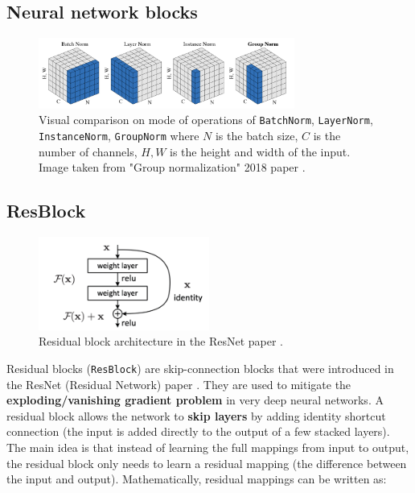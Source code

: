 \subsection{Neural network blocks}
\label{appendix:blocks}


\begin{figure}
    \centering
    \includegraphics[width=0.75\textwidth]{images/appendix/blocks/norm.png}
    \caption{Visual comparison on mode of operations of \texttt{BatchNorm}, \texttt{LayerNorm}, \texttt{InstanceNorm}, \texttt{GroupNorm} where $N$ is the batch size, $C$ is the number of channels, $H,W$ is the height and width of the input. Image taken from "Group normalization" 2018 paper \cite{wu2018group}.}
    \label{fig:appendix_blocks_norm}
\end{figure}





\subsection*{ResBlock}

\begin{figure}
    \centering
    \includegraphics[width=0.5\textwidth]{images/appendix/blocks/resnet.png}
    \caption{Residual block architecture in the ResNet paper \cite{resnet}.}
    \label{fig:appendix_blocks_residual_block}
\end{figure}

Residual blocks (\texttt{ResBlock}) are skip-connection blocks that were introduced in the ResNet (Residual Network) paper \cite{resnet}. They are used to mitigate the \textbf{exploding/vanishing gradient problem} in very deep neural networks. A residual block allows the network to \textbf{skip layers} by adding identity shortcut connection (the input is added directly to the output of a few stacked layers). The main idea is that instead of learning the full mappings from input to output, the residual block only needs to learn a residual mapping (the difference between the input and output). Mathematically, residual mappings can be written as:

